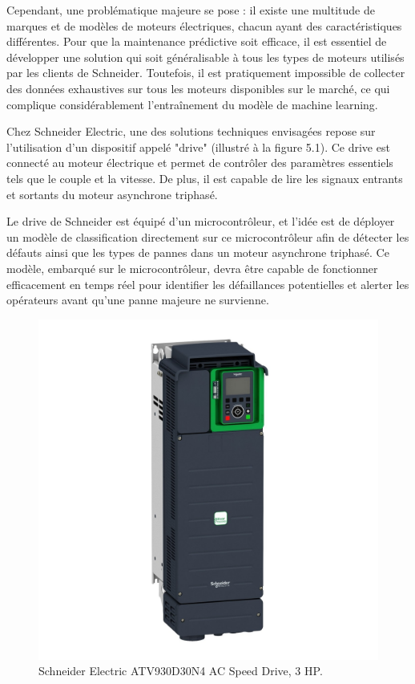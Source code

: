 Cependant, une problématique majeure se pose : il existe une multitude de
marques et de modèles de moteurs électriques, chacun ayant des caractéristiques
différentes. Pour que la maintenance prédictive soit efficace, il est essentiel
de développer une solution qui soit généralisable à tous les types de moteurs
utilisés par les clients de Schneider. Toutefois, il est pratiquement
impossible de collecter des données exhaustives sur tous les moteurs
disponibles sur le marché, ce qui complique considérablement l'entraînement du
modèle de machine learning.

Chez Schneider Electric, une des solutions techniques envisagées repose sur
l'utilisation d'un dispositif appelé "drive" (illustré à la figure 5.1). Ce
drive est connecté au moteur électrique et permet de contrôler des paramètres
essentiels tels que le couple et la vitesse. De plus, il est capable de lire
les signaux entrants et sortants du moteur asynchrone triphasé.

Le drive de Schneider est équipé d'un microcontrôleur, et l'idée est de
déployer un modèle de classification directement sur ce microcontrôleur afin de
détecter les défauts ainsi que les types de pannes dans un moteur asynchrone
triphasé. Ce modèle, embarqué sur le microcontrôleur, devra être capable de
fonctionner efficacement en temps réel pour identifier les défaillances
potentielles et alerter les opérateurs avant qu'une panne majeure ne survienne.

\begin{figure}[hbt!]
  \centering
  \includegraphics[width=12cm]{images_pfe/drive_se.jpg}
  \caption{Schneider Electric ATV930D30N4 AC Speed Drive, 3 HP.}
  \label{fig:drive}
\end{figure}
\FloatBarrier

